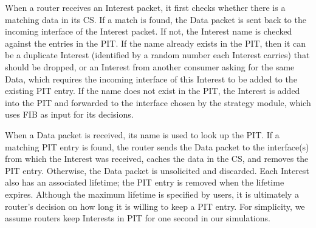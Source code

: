 When a router receives an Interest packet, it first checks whether there is a matching data in its CS.
If a match is found, the Data packet is sent back to the incoming interface of the Interest packet.
If not, the Interest name is checked against the entries in the PIT. 
If the name already exists in the PIT, then it can be a duplicate Interest (identified by a random number each Interest carries) that should be dropped,
or an Interest from another consumer asking for the same Data, which requires the incoming interface of this Interest to be added to the existing PIT entry.
If the name does not exist in the PIT, the Interest is added into the PIT and forwarded to the interface chosen by the strategy module, which uses FIB as input for its decisions.

When a Data packet is received, its name is used to look up the PIT.
If a matching PIT entry is found,
the router sends the Data packet to the interface(s) from which the Interest was received, caches the data in the CS, and removes the PIT entry.  Otherwise, the Data packet is unsolicited and discarded. 
Each Interest also has an associated lifetime; the PIT entry is removed when the lifetime expires.
Although the maximum lifetime is specified by users, it is ultimately a router's decision on how long it is willing to keep a PIT entry.  
For simplicity, we assume routers keep Interests in PIT for one second in our simulations.






